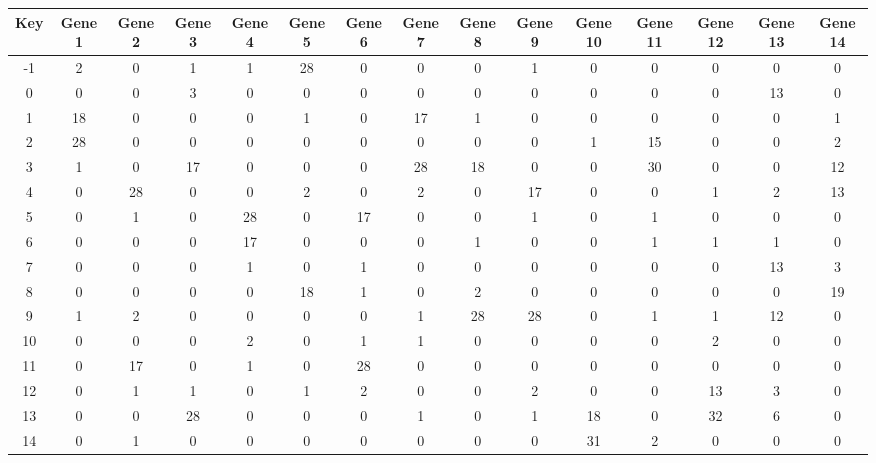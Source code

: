 \begin{tabular}{|c|c|c|c|c|c|c|c|c|c|c|c|c|c|c|}
\hline
Key & Gene 1 & Gene 2 & Gene 3 & Gene 4 & Gene 5 & Gene 6 & Gene 7 & Gene 8 & Gene 9 & Gene 10 & Gene 11 & Gene 12 & Gene 13 & Gene 14 \\
\hline
-1 & 2 & 0 & 1 & 1 & 28 & 0 & 0 & 0 & 1 & 0 & 0 & 0 & 0 & 0 \\
0 & 0 & 0 & 3 & 0 & 0 & 0 & 0 & 0 & 0 & 0 & 0 & 0 & 13 & 0 \\
1 & 18 & 0 & 0 & 0 & 1 & 0 & 17 & 1 & 0 & 0 & 0 & 0 & 0 & 1 \\
2 & 28 & 0 & 0 & 0 & 0 & 0 & 0 & 0 & 0 & 1 & 15 & 0 & 0 & 2 \\
3 & 1 & 0 & 17 & 0 & 0 & 0 & 28 & 18 & 0 & 0 & 30 & 0 & 0 & 12 \\
4 & 0 & 28 & 0 & 0 & 2 & 0 & 2 & 0 & 17 & 0 & 0 & 1 & 2 & 13 \\
5 & 0 & 1 & 0 & 28 & 0 & 17 & 0 & 0 & 1 & 0 & 1 & 0 & 0 & 0 \\
6 & 0 & 0 & 0 & 17 & 0 & 0 & 0 & 1 & 0 & 0 & 1 & 1 & 1 & 0 \\
7 & 0 & 0 & 0 & 1 & 0 & 1 & 0 & 0 & 0 & 0 & 0 & 0 & 13 & 3 \\
8 & 0 & 0 & 0 & 0 & 18 & 1 & 0 & 2 & 0 & 0 & 0 & 0 & 0 & 19 \\
9 & 1 & 2 & 0 & 0 & 0 & 0 & 1 & 28 & 28 & 0 & 1 & 1 & 12 & 0 \\
10 & 0 & 0 & 0 & 2 & 0 & 1 & 1 & 0 & 0 & 0 & 0 & 2 & 0 & 0 \\
11 & 0 & 17 & 0 & 1 & 0 & 28 & 0 & 0 & 0 & 0 & 0 & 0 & 0 & 0 \\
12 & 0 & 1 & 1 & 0 & 1 & 2 & 0 & 0 & 2 & 0 & 0 & 13 & 3 & 0 \\
13 & 0 & 0 & 28 & 0 & 0 & 0 & 1 & 0 & 1 & 18 & 0 & 32 & 6 & 0 \\
14 & 0 & 1 & 0 & 0 & 0 & 0 & 0 & 0 & 0 & 31 & 2 & 0 & 0 & 0 \\
\hline
\end{tabular}